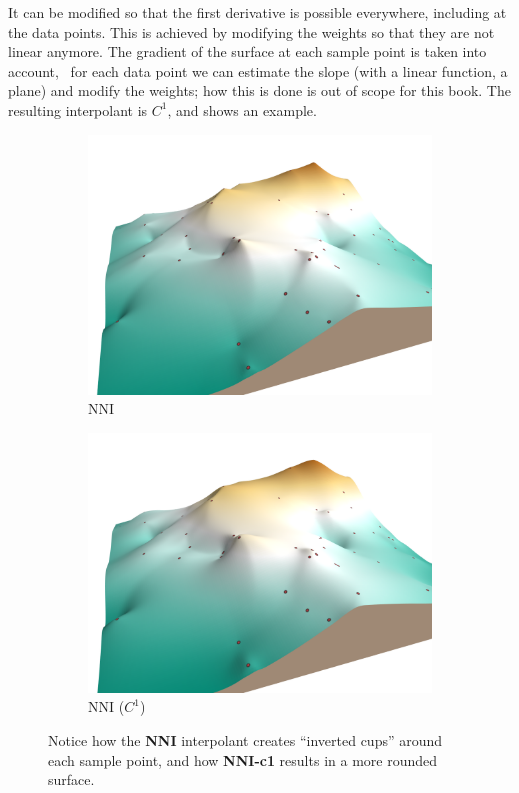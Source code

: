 It can be modified so that the first derivative is possible everywhere, including at the data points.
This is achieved by modifying the weights so that they are not linear anymore.
The gradient of the surface at each sample point is taken into account, \ie\ for each data point we can estimate the slope (with a linear function, a plane) and modify the weights; how this is done is out of scope for this book.
The resulting interpolant is $C^1$, and  shows an example.
\begin{figure}
  \centering
  \begin{subfigure}[b]{0.5\linewidth}
    \centering
    \includegraphics[width=\textwidth]{figs/nni.png}
    \caption{NNI}
  \end{subfigure}%
  \begin{subfigure}[b]{0.5\linewidth}
    \centering
    \includegraphics[width=\textwidth]{figs/nni_c1.png}
    \caption{NNI ($C^1$)}
  \end{subfigure}
\caption{Notice how the \textbf{NNI} interpolant creates ``inverted cups'' around each sample point, and how \textbf{NNI-c1} results in a more rounded surface.}%
\end{figure}



